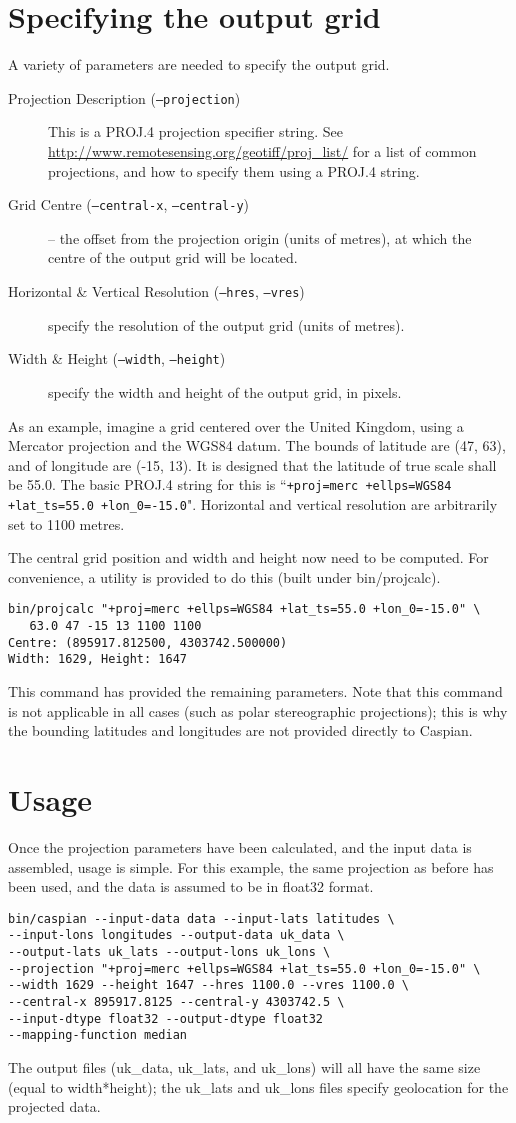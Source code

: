 \documentclass[a4paper,12pt]{article}
\begin{document}
\section{Specifying the output grid}
A variety of parameters are needed to specify the output grid.
\begin{description}
\item[Projection Description (\texttt{--projection})] This is a PROJ.4 projection specifier string. See \url{http://www.remotesensing.org/geotiff/proj_list/} for a list of common projections, and how to specify them using a PROJ.4 string.
\item[Grid Centre (\texttt{--central-x}, \texttt{--central-y})] -- the offset from the projection origin (units of metres), at which the centre of the output grid will be located.
\item[Horizontal \& Vertical Resolution (\texttt{--hres}, \texttt{--vres})] specify the resolution of the output grid (units of metres).
\item[Width \& Height (\texttt{--width}, \texttt{--height})] specify the width and height of the output grid, in pixels.
\end{description}

As an example, imagine a grid centered over the United Kingdom, using a Mercator projection and the WGS84 datum. The bounds of latitude are (47, 63), and of longitude are (-15, 13). It is designed that the latitude of true scale shall be 55.0. The basic PROJ.4 string for this is ``\texttt{+proj=merc +ellps=WGS84 +lat\_ts=55.0 +lon\_0=-15.0}". Horizontal and vertical resolution are arbitrarily set to 1100 metres.

The central grid position and width and height now need to be computed. For convenience, a utility is provided to do this (built under bin/projcalc).
\begin{verbatim}
bin/projcalc "+proj=merc +ellps=WGS84 +lat_ts=55.0 +lon_0=-15.0" \
   63.0 47 -15 13 1100 1100
Centre: (895917.812500, 4303742.500000)
Width: 1629, Height: 1647
\end{verbatim}
This command has provided the remaining parameters. Note that this command is not applicable in all cases (such as polar stereographic projections); this is why the bounding latitudes and longitudes are not provided directly to Caspian.

\section{Usage}
Once the projection parameters have been calculated, and the input data is assembled, usage is simple. For this example, the same projection as before has been used, and the data is assumed to be in float32 format.
\begin{verbatim}
bin/caspian --input-data data --input-lats latitudes \
--input-lons longitudes --output-data uk_data \
--output-lats uk_lats --output-lons uk_lons \
--projection "+proj=merc +ellps=WGS84 +lat_ts=55.0 +lon_0=-15.0" \
--width 1629 --height 1647 --hres 1100.0 --vres 1100.0 \
--central-x 895917.8125 --central-y 4303742.5 \
--input-dtype float32 --output-dtype float32
--mapping-function median
\end{verbatim}

The output files (uk\_data, uk\_lats, and uk\_lons) will all have the same size (equal to width*height); the uk\_lats and uk\_lons files specify geolocation for the projected data.
\end{document}
